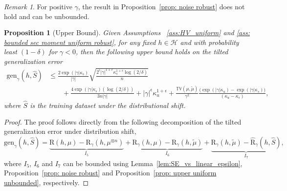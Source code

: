 \documentclass{article}
\theoremstyle{plain}
\theoremstyle{plain}
\newtheorem{proposition}[theorem]{Proposition}
\theoremstyle{definition}
\theoremstyle{remark}
\newtheorem{remark}[theorem]{Remark}
\newcommand{\RTERM}{\widehat{\mathrm{R}}_{\gamma}}
\newcommand{\RTrue}{\mathrm{R}}
\newcommand{\RTET}{\mathrm{R}_{\gamma}}
\begin{document}
\begin{remark}
    For positive $\gamma$, the result in Proposition~\ref{prop: noise robust} does not hold and can be unbounded.
\end{remark}
\begin{tcolorbox}
\begin{proposition}[Upper Bound]\label{prop:robust_upper}
    Given Assumptions~ \ref{ass:HV_uniform} and \ref{ass: bounded sec moment uniform robust}, for any fixed $h\in\mathcal{H}$ and with probability least $(1-\delta)$  for $\gamma<0$, then the following upper bound holds on the tilted generalization error
     \begin{equation*}
    \begin{split}
      \mathrm{gen}_{\gamma}(h,\hat{S})&\leq \frac{2\exp(|\gamma| \kappa_s)}{|\gamma|}\sqrt{\frac{2^{\epsilon}|\gamma|^{1+\epsilon}\kappa_s^{1+\epsilon}\log(2/\delta)}{n}}\\
      &\qquad+\frac{4\exp(|\gamma| \kappa_s)(\log(2/\delta))}{3n|\gamma|} +|\gamma|^{\epsilon}\kappa_u^{1+\epsilon}+\frac{\mathbb{TV}(\mu,\tilde{\mu})}{\gamma^2 }\frac{\big(\exp(|\gamma|\kappa_u)-\exp(|\gamma|\kappa_s)\big)}{(\kappa_u-\kappa_s)},
      \end{split}
    \end{equation*}
    where $\hat{S}$ is the training dataset under the distributional shift.
\end{proposition}
\end{tcolorbox}

\begin{proof}
    The proof follows directly from the following decomposition of the tilted generalization error under distribution shift,
    \[ \mathrm{gen}_{\gamma}(h,\hat{S})=\underbrace{\RTrue(h,\mu)- \RTET(h,\mu^{\otimes n})}_{I_5}+ 
    \underbrace{\RTET(h,\mu)-\RTET(h,\tilde{\mu})}_{I_6}+\underbrace{\RTET(h,\tilde{\mu})-\RTERM(h,\hat{S})}_{I_7},\]
    where $I_5$, $I_6$ and $I_7$ can be bounded using Lemma~\ref{lem:SE_vs_linear_epsilon}, Proposition~\ref{prop: noise robust} and Proposition~\ref{prop: upper uniform unbounded}, respectively.
\end{proof}
\end{document}
